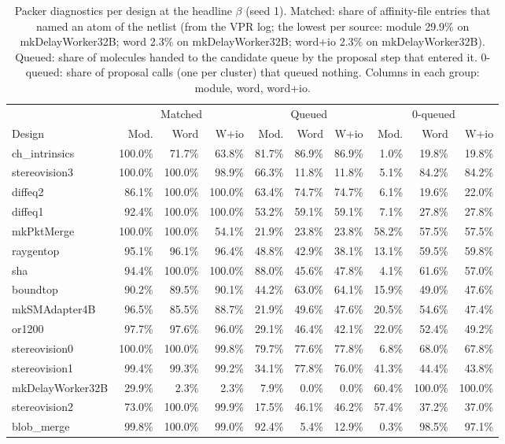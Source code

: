 \begin{table}[t]
\caption{Packer diagnostics per design at the headline $\beta$ (seed 1). Matched: share of affinity-file entries that
named an atom of the netlist (from the VPR log; the lowest per source: module 29.9\% on mkDelayWorker32B; word 2.3\% on mkDelayWorker32B; word+io 2.3\% on mkDelayWorker32B). Queued: share of molecules handed to the
candidate queue by the proposal step that entered it. 0-queued: share of proposal calls (one per cluster) that queued
nothing. Columns in each group: module, word, word+io.}
\label{tab:r3diag}
\centering
\footnotesize\setlength{\tabcolsep}{3pt}
\begin{tabular}{lrrrrrrrrr}
\toprule
 & \multicolumn{3}{c}{Matched} & \multicolumn{3}{c}{Queued} & \multicolumn{3}{c}{0-queued} \\
\cmidrule(lr){2-4}\cmidrule(lr){5-7}\cmidrule(lr){8-10}
Design & Mod. & Word & W+io & Mod. & Word & W+io & Mod. & Word & W+io \\
\midrule
ch\_intrinsics & 100.0\% & 71.7\% & 63.8\% & 81.7\% & 86.9\% & 86.9\% & 1.0\% & 19.8\% & 19.8\% \\
stereovision3 & 100.0\% & 100.0\% & 98.9\% & 66.3\% & 11.8\% & 11.8\% & 5.1\% & 84.2\% & 84.2\% \\
diffeq2 & 86.1\% & 100.0\% & 100.0\% & 63.4\% & 74.7\% & 74.7\% & 6.1\% & 19.6\% & 22.0\% \\
diffeq1 & 92.4\% & 100.0\% & 100.0\% & 53.2\% & 59.1\% & 59.1\% & 7.1\% & 27.8\% & 27.8\% \\
mkPktMerge & 100.0\% & 100.0\% & 54.1\% & 21.9\% & 23.8\% & 23.8\% & 58.2\% & 57.5\% & 57.5\% \\
raygentop & 95.1\% & 96.1\% & 96.4\% & 48.8\% & 42.9\% & 38.1\% & 13.1\% & 59.5\% & 59.8\% \\
sha & 94.4\% & 100.0\% & 100.0\% & 88.0\% & 45.6\% & 47.8\% & 4.1\% & 61.6\% & 57.0\% \\
boundtop & 90.2\% & 89.5\% & 90.1\% & 44.2\% & 63.0\% & 64.1\% & 15.9\% & 49.0\% & 47.6\% \\
mkSMAdapter4B & 96.5\% & 85.5\% & 88.7\% & 21.9\% & 49.6\% & 47.6\% & 20.5\% & 54.6\% & 47.4\% \\
or1200 & 97.7\% & 97.6\% & 96.0\% & 29.1\% & 46.4\% & 42.1\% & 22.0\% & 52.4\% & 49.2\% \\
stereovision0 & 100.0\% & 100.0\% & 99.8\% & 79.7\% & 77.6\% & 77.8\% & 6.8\% & 68.0\% & 67.8\% \\
stereovision1 & 99.4\% & 99.3\% & 99.2\% & 34.1\% & 77.8\% & 76.0\% & 41.3\% & 44.4\% & 43.8\% \\
mkDelayWorker32B & 29.9\% & 2.3\% & 2.3\% & 7.9\% & 0.0\% & 0.0\% & 60.4\% & 100.0\% & 100.0\% \\
stereovision2 & 73.0\% & 100.0\% & 99.9\% & 17.5\% & 46.1\% & 46.2\% & 57.4\% & 37.2\% & 37.0\% \\
blob\_merge & 99.8\% & 100.0\% & 99.0\% & 92.4\% & 5.4\% & 12.9\% & 0.3\% & 98.5\% & 97.1\% \\
\bottomrule
\end{tabular}
\end{table}

